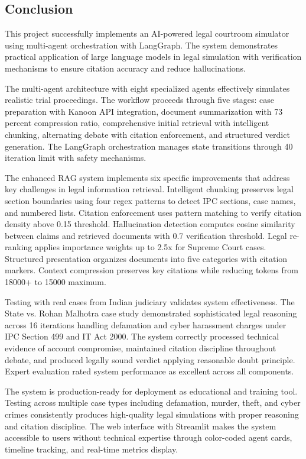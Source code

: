 \documentclass[12pt,singleside,a4paper]{article}
\begin{document}
\subsection{Conclusion}
    This project successfully implements an AI-powered legal courtroom simulator using multi-agent orchestration with LangGraph. The system demonstrates practical application of large language models in legal simulation with verification mechanisms to ensure citation accuracy and reduce hallucinations.

    The multi-agent architecture with eight specialized agents effectively simulates realistic trial proceedings. The workflow proceeds through five stages: case preparation with Kanoon API integration, document summarization with 73 percent compression ratio, comprehensive initial retrieval with intelligent chunking, alternating debate with citation enforcement, and structured verdict generation. The LangGraph orchestration manages state transitions through 40 iteration limit with safety mechanisms.

    The enhanced RAG system implements six specific improvements that address key challenges in legal information retrieval. Intelligent chunking preserves legal section boundaries using four regex patterns to detect IPC sections, case names, and numbered lists. Citation enforcement uses pattern matching to verify citation density above 0.15 threshold. Hallucination detection computes cosine similarity between claims and retrieved documents with 0.7 verification threshold. Legal re-ranking applies importance weights up to 2.5x for Supreme Court cases. Structured presentation organizes documents into five categories with citation markers. Context compression preserves key citations while reducing tokens from 18000+ to 15000 maximum.

    Testing with real cases from Indian judiciary validates system effectiveness. The State vs. Rohan Malhotra case study demonstrated sophisticated legal reasoning across 16 iterations handling defamation and cyber harassment charges under IPC Section 499 and IT Act 2000. The system correctly processed technical evidence of account compromise, maintained citation discipline throughout debate, and produced legally sound verdict applying reasonable doubt principle. Expert evaluation rated system performance as excellent across all components.

    The system is production-ready for deployment as educational and training tool. Testing across multiple case types including defamation, murder, theft, and cyber crimes consistently produces high-quality legal simulations with proper reasoning and citation discipline. The web interface with Streamlit makes the system accessible to users without technical expertise through color-coded agent cards, timeline tracking, and real-time metrics display.
\end{document}
